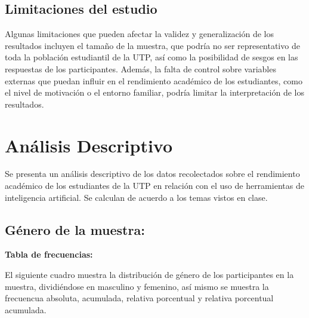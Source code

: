 \documentclass{article}
\newenvironment{metodologia}{}{}
\newenvironment{analisisDescriptivo}{}{}
\begin{document}
\begin{metodologia}
  \subsection{Limitaciones del estudio}

  Algunas limitaciones que pueden afectar la validez y generalización de los resultados incluyen el tamaño de la muestra, que podría no ser representativo de toda la población estudiantil de la UTP, así como la posibilidad de sesgos en las respuestas de los participantes. Además, la falta de control sobre variables externas que puedan influir en el rendimiento académico de los estudiantes, como el nivel de motivación o el entorno familiar, podría limitar la interpretación de los resultados.
\end{metodologia}

\newpage

\begin{analisisDescriptivo}

  \section{Análisis Descriptivo}
  \vspace{-0.5cm}
  Se presenta un análisis descriptivo de los datos recolectados sobre el rendimiento académico de los estudiantes de la UTP en relación con el uso de herramientas de inteligencia artificial. Se calculan de acuerdo a los temas vistos en clase.
  
\end{analisisDescriptivo}

\vspace{-0.5cm}
\subsection{Género de la muestra:}
  
  \textbf{Tabla de frecuencias:}
  
  El siguiente cuadro muestra la distribución de género de los participantes en la muestra, dividiéndose en masculino y femenino, así mismo se muestra la frecuencua absoluta, acumulada, relativa porcentual y relativa porcentual acumulada.
\end{document}

